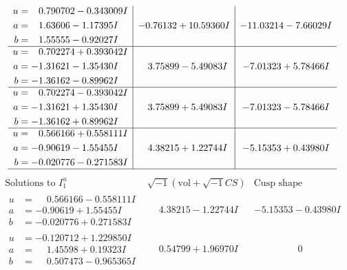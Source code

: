 \documentclass[1p]{elsarticle_modified}
\theoremstyle{definition}
\newcommand{\I}{\sqrt{-1}}
\begin{document}
$$\begin{array}{c|c|c}
\begin{aligned}
u &= \phantom{-}0.790702 - 0.343009 I \\
a &= \phantom{-}1.63606 - 1.17395 I \\
b &= \phantom{-}1.55555 - 0.92027 I\end{aligned}
 & -0.76132 + 10.59360 I & -11.03214 - 7.66029 I \\ \hline\begin{aligned}
u &= \phantom{-}0.702274 + 0.393042 I \\
a &= -1.31621 - 1.35430 I \\
b &= -1.36162 - 0.89962 I\end{aligned}
 & \phantom{-}3.75899 - 5.49083 I & -7.01323 + 5.78466 I \\ \hline\begin{aligned}
u &= \phantom{-}0.702274 - 0.393042 I \\
a &= -1.31621 + 1.35430 I \\
b &= -1.36162 + 0.89962 I\end{aligned}
 & \phantom{-}3.75899 + 5.49083 I & -7.01323 - 5.78466 I \\ \hline\begin{aligned}
u &= \phantom{-}0.566166 + 0.558111 I \\
a &= -0.90619 - 1.55455 I \\
b &= -0.020776 - 0.271583 I\end{aligned}
 & \phantom{-}4.38215 + 1.22744 I & -5.15353 + 0.43980 I\\
 \hline 
 \end{array}$$\newpage$$\begin{array}{c|c|c}  
\text{Solutions to }I^u_{1}& \I (\text{vol} + \sqrt{-1}CS) & \text{Cusp shape}\\
 \hline 
\begin{aligned}
u &= \phantom{-}0.566166 - 0.558111 I \\
a &= -0.90619 + 1.55455 I \\
b &= -0.020776 + 0.271583 I\end{aligned}
 & \phantom{-}4.38215 - 1.22744 I & -5.15353 - 0.43980 I \\ \hline\begin{aligned}
u &= -0.120712 + 1.229850 I \\
a &= \phantom{-}1.45598 + 0.19323 I \\
b &= \phantom{-}0.507473 - 0.965365 I\end{aligned}
 & \phantom{-}0.54799 + 1.96970 I & \phantom{-0.000000 } 0 \\ \hline\begin{aligned}

\end{aligned}
\end{array}$$
\end{document}
